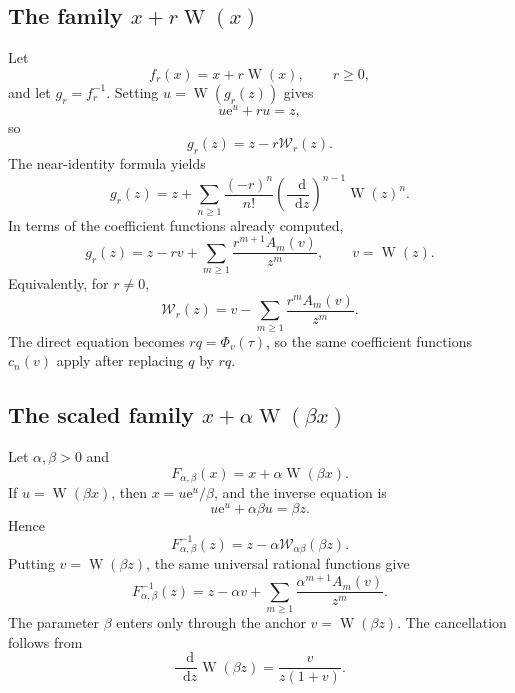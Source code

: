 \documentclass[11pt,oneside]{article}
\theoremstyle{plain}
\theoremstyle{definition}
\theoremstyle{remark}
\newcommand{\W}{\operatorname{W}}
\newcommand{\rW}{\mathcal{W}}
\newcommand{\e}{\mathrm{e}}
\newcommand{\dd}{\mathop{}\!\mathrm{d}}
\begin{document}
\subsection{The family \texorpdfstring{\(x+r\W(x)\)}{x+rW(x)}}

Let
\begin{equation}
 f_r(x)=x+r\W(x),\qquad r\ge0,
 \label{eq:fr-def}
\end{equation}
and let \(g_r=f_r^{-1}\).  Setting \(u=\W(g_r(z))\) gives
\begin{equation}
 u\e^u+ru=z,
 \label{eq:r-u-equation}
\end{equation}
so
\begin{equation}
 g_r(z)=z-r\rW_r(z).
 \label{eq:gr-exact}
\end{equation}
The near-identity formula yields
\begin{equation}
 g_r(z)=z+\sum_{n\ge1}\frac{(-r)^n}{n!}
 \left(\frac{\dd}{\dd z}\right)^{n-1}\W(z)^n.
 \label{eq:gr-LB}
\end{equation}
In terms of the coefficient functions already computed,
\begin{equation}
 \boxed{
 g_r(z)=z-rv+\sum_{m\ge1}\frac{r^{m+1}A_m(v)}{z^m},
 \qquad v=\W(z).}
 \label{eq:gr-anchored}
\end{equation}
Equivalently, for \(r\ne0\),
\begin{equation}
 \rW_r(z)=v-\sum_{m\ge1}\frac{r^mA_m(v)}{z^m}.
 \label{eq:rW-expansion}
\end{equation}
The direct equation becomes \(rq=\Phi_v(\tau)\), so the same coefficient
functions \(c_n(v)\) apply after replacing \(q\) by \(rq\).

\subsection{The scaled family \texorpdfstring{\(x+\alpha\W(\beta x)\)}{x+alpha W(beta x)}}

Let \(\alpha,\beta>0\) and
\begin{equation}
 F_{\alpha,\beta}(x)=x+\alpha\W(\beta x).
 \label{eq:scaled-family}
\end{equation}
If \(u=\W(\beta x)\), then \(x=u\e^u/\beta\), and the inverse equation is
\begin{equation}
 u\e^u+\alpha\beta u=\beta z.
 \label{eq:scaled-u}
\end{equation}
Hence
\begin{equation}
 F_{\alpha,\beta}^{-1}(z)
 =z-\alpha\rW_{\alpha\beta}(\beta z).
 \label{eq:scaled-exact}
\end{equation}
Putting \(v=\W(\beta z)\), the same universal rational functions give
\begin{equation}
 \boxed{
 F_{\alpha,\beta}^{-1}(z)
 =z-\alpha v+\sum_{m\ge1}
 \frac{\alpha^{m+1}A_m(v)}{z^m}.}
 \label{eq:scaled-expansion}
\end{equation}
The parameter \(\beta\) enters only through the anchor \(v=\W(\beta z)\).
The cancellation follows from
\[
 \frac{\dd}{\dd z}\W(\beta z)=\frac{v}{z(1+v)}.
\]
\end{document}
